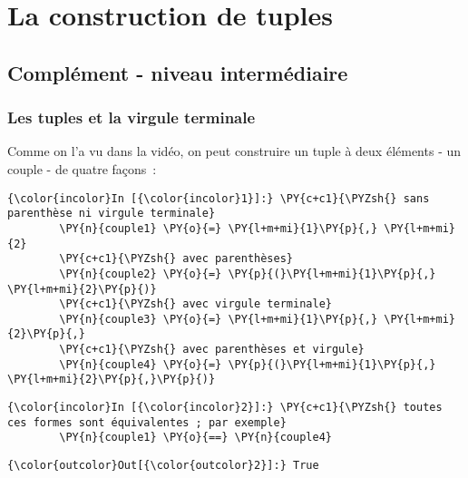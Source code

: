     \hypertarget{la-construction-de-tuples}{%
\section{La construction de tuples}\label{la-construction-de-tuples}}

    \hypertarget{compluxe9ment---niveau-intermuxe9diaire}{%
\subsection{Complément - niveau
intermédiaire}\label{compluxe9ment---niveau-intermuxe9diaire}}

    \hypertarget{les-tuples-et-la-virgule-terminale}{%
\subsubsection{Les tuples et la virgule
terminale}\label{les-tuples-et-la-virgule-terminale}}

    Comme on l'a vu dans la vidéo, on peut construire un tuple à deux
éléments - un couple - de quatre façons~:

    \begin{Verbatim}[commandchars=\\\{\}]
{\color{incolor}In [{\color{incolor}1}]:} \PY{c+c1}{\PYZsh{} sans parenthèse ni virgule terminale}
        \PY{n}{couple1} \PY{o}{=} \PY{l+m+mi}{1}\PY{p}{,} \PY{l+m+mi}{2}
        \PY{c+c1}{\PYZsh{} avec parenthèses}
        \PY{n}{couple2} \PY{o}{=} \PY{p}{(}\PY{l+m+mi}{1}\PY{p}{,} \PY{l+m+mi}{2}\PY{p}{)}
        \PY{c+c1}{\PYZsh{} avec virgule terminale}
        \PY{n}{couple3} \PY{o}{=} \PY{l+m+mi}{1}\PY{p}{,} \PY{l+m+mi}{2}\PY{p}{,}
        \PY{c+c1}{\PYZsh{} avec parenthèses et virgule}
        \PY{n}{couple4} \PY{o}{=} \PY{p}{(}\PY{l+m+mi}{1}\PY{p}{,} \PY{l+m+mi}{2}\PY{p}{,}\PY{p}{)}
\end{Verbatim}


    \begin{Verbatim}[commandchars=\\\{\}]
{\color{incolor}In [{\color{incolor}2}]:} \PY{c+c1}{\PYZsh{} toutes ces formes sont équivalentes ; par exemple}
        \PY{n}{couple1} \PY{o}{==} \PY{n}{couple4}
\end{Verbatim}


\begin{Verbatim}[commandchars=\\\{\}]
{\color{outcolor}Out[{\color{outcolor}2}]:} True
\end{Verbatim}
            
